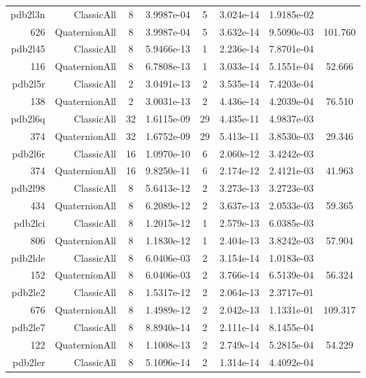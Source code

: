 \begin{xltabular}{\textwidth}{r|rcS[table-format=1.4e+2]cS[table-format=1.3e+2]S[table-format=1.4e+2]S[table-format=-1.3]}
pdb2l3n & ClassicAll & 8 & 3.9987e-04 & 5 & 3.024e-14 & 1.9185e-02 & \\
626 & QuaternionAll & 8 & 3.9987e-04 & 5 & 3.632e-14 & 9.5090e-03 & 101.760\\  \addlinespace
pdb2l45 & ClassicAll & 8 & 5.9466e-13 & 1 & 2.236e-14 & 7.8701e-04 & \\
116 & QuaternionAll & 8 & 6.7808e-13 & 1 & 3.033e-14 & 5.1551e-04 & 52.666\\  \addlinespace
pdb2l5r & ClassicAll & 2 & 3.0491e-13 & 2 & 3.535e-14 & 7.4203e-04 & \\
138 & QuaternionAll & 2 & 3.0031e-13 & 2 & 4.436e-14 & 4.2039e-04 & 76.510\\  \addlinespace
pdb2l6q & ClassicAll & 32 & 1.6115e-09 & 29 & 4.435e-11 & 4.9837e-03 & \\
374 & QuaternionAll & 32 & 1.6752e-09 & 29 & 5.413e-11 & 3.8530e-03 & 29.346\\  \addlinespace
pdb2l6r & ClassicAll & 16 & 1.0970e-10 & 6 & 2.060e-12 & 3.4242e-03 & \\
374 & QuaternionAll & 16 & 9.8250e-11 & 6 & 2.174e-12 & 2.4121e-03 & 41.963\\  \addlinespace
pdb2l98 & ClassicAll & 8 & 5.6413e-12 & 2 & 3.273e-13 & 3.2723e-03 & \\
434 & QuaternionAll & 8 & 6.2089e-12 & 2 & 3.637e-13 & 2.0533e-03 & 59.365\\  \addlinespace
pdb2lci & ClassicAll & 8 & 1.2015e-12 & 1 & 2.579e-13 & 6.0385e-03 & \\
806 & QuaternionAll & 8 & 1.1830e-12 & 1 & 2.404e-13 & 3.8242e-03 & 57.904\\  \addlinespace
pdb2lde & ClassicAll & 8 & 6.0406e-03 & 2 & 3.154e-14 & 1.0183e-03 & \\
152 & QuaternionAll & 8 & 6.0406e-03 & 2 & 3.766e-14 & 6.5139e-04 & 56.324\\  \addlinespace
pdb2le2 & ClassicAll & 8 & 1.5317e-12 & 2 & 2.064e-13 & 2.3717e-01 & \\
676 & QuaternionAll & 8 & 1.4989e-12 & 2 & 2.042e-13 & 1.1331e-01 & 109.317\\  \addlinespace
pdb2le7 & ClassicAll & 8 & 8.8940e-14 & 2 & 2.111e-14 & 8.1455e-04 & \\
122 & QuaternionAll & 8 & 1.1008e-13 & 2 & 2.749e-14 & 5.2815e-04 & 54.229\\  \addlinespace
pdb2ler & ClassicAll & 8 & 5.1096e-14 & 2 & 1.314e-14 & 4.4092e-04 & \\

\end{xltabular}
